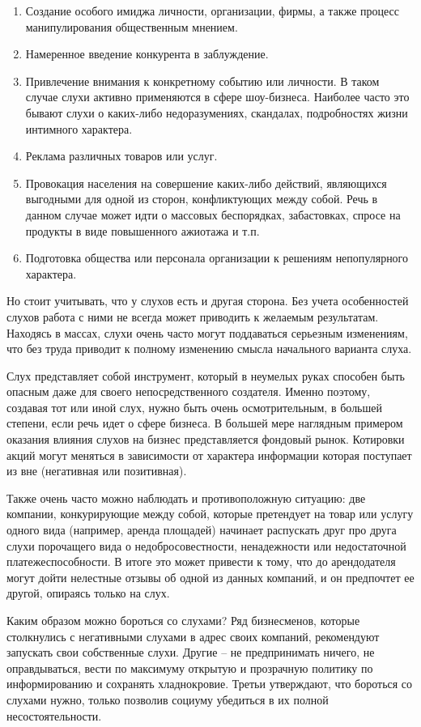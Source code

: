 \documentclass[a4paper,14pt,russian]{report}
\begin{document}
\begin{enumerate}
  \item Создание особого имиджа личности, организации, фирмы, а также процесс манипулирования общественным мнением.
  \item Намеренное введение конкурента в заблуждение.
  \item Привлечение внимания к конкретному событию или личности. В таком случае слухи активно применяются в сфере шоу-бизнеса. Наиболее часто это бывают слухи о каких-либо недоразумениях, скандалах, подробностях жизни интимного характера.
  \item Реклама различных товаров или услуг.
  \item Провокация населения на совершение каких-либо действий, являющихся выгодными для одной из сторон, конфликтующих между собой. Речь в данном случае может идти о массовых беспорядках, забастовках, спросе на продукты в виде повышенного ажиотажа и т.п.
  \item Подготовка общества или персонала организации к решениям непопулярного характера.
\end{enumerate}

Но стоит учитывать, что у слухов есть и другая сторона. Без учета особенностей слухов работа с ними не всегда может приводить к желаемым результатам. Находясь в массах, слухи очень часто могут поддаваться серьезным изменениям, что без труда приводит к полному изменению смысла начального варианта слуха.

Слух представляет собой инструмент, который в неумелых руках способен быть опасным даже для своего непосредственного создателя. Именно поэтому, создавая тот или иной слух, нужно быть очень осмотрительным, в большей степени, если речь идет о сфере бизнеса. В большей мере наглядным примером оказания влияния слухов на бизнес представляется фондовый рынок. Котировки акций могут меняться в зависимости от характера информации которая поступает из вне (негативная или позитивная).

Также очень часто можно наблюдать и противоположную ситуацию: две компании, конкурирующие между собой, которые претендует на товар или услугу одного вида (например, аренда площадей) начинает распускать друг про друга слухи порочащего вида о недобросовестности, ненадежности или недостаточной платежеспособности. В итоге это может привести к тому, что до арендодателя могут дойти нелестные отзывы об одной из данных компаний, и он предпочтет ее другой, опираясь только на слух.

Каким образом можно бороться со слухами? Ряд бизнесменов, которые столкнулись с негативными слухами в адрес своих компаний, рекомендуют запускать свои собственные слухи. Другие – не предпринимать ничего, не оправдываться, вести по максимуму открытую и прозрачную политику по информированию и сохранять хладнокровие. Третьи утверждают, что бороться со слухами нужно, только позволив социуму убедиться в их полной несостоятельности.
\end{document}
